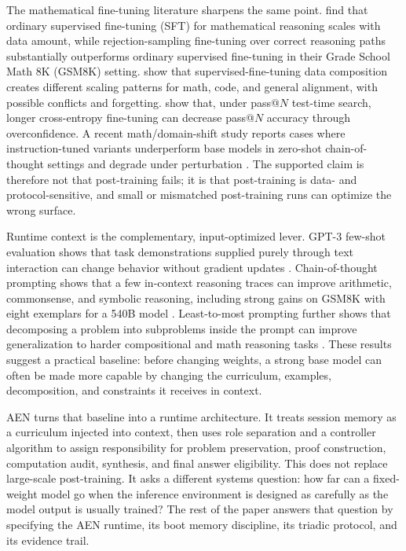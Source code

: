 \documentclass[11pt]{article}
\begin{document}
The mathematical fine-tuning literature sharpens the same point. \citet{yuan2023scalingmath} find that ordinary supervised fine-tuning (SFT) for mathematical reasoning scales with data amount, while rejection-sampling fine-tuning over correct reasoning paths substantially outperforms ordinary supervised fine-tuning in their Grade School Math 8K (GSM8K) setting. \citet{dong2024abilities} show that supervised-fine-tuning data composition creates different scaling patterns for math, code, and general alignment, with possible conflicts and forgetting. \citet{chen2025rethinking} show that, under pass@\(N\) test-time search, longer cross-entropy fine-tuning can decrease pass@\(N\) accuracy through overconfidence. A recent math/domain-shift study reports cases where instruction-tuned variants underperform base models in zero-shot chain-of-thought settings and degrade under perturbation \citep{munjal2026instructiontuned}. The supported claim is therefore not that post-training fails; it is that post-training is data- and protocol-sensitive, and small or mismatched post-training runs can optimize the wrong surface.

Runtime context is the complementary, input-optimized lever. GPT-3 few-shot evaluation shows that task demonstrations supplied purely through text interaction can change behavior without gradient updates \citep{brown2020fewshot}. Chain-of-thought prompting shows that a few in-context reasoning traces can improve arithmetic, commonsense, and symbolic reasoning, including strong gains on GSM8K with eight exemplars for a 540B model \citep{wei2022cot}. Least-to-most prompting further shows that decomposing a problem into subproblems inside the prompt can improve generalization to harder compositional and math reasoning tasks \citep{zhou2022leasttomost}. These results suggest a practical baseline: before changing weights, a strong base model can often be made more capable by changing the curriculum, examples, decomposition, and constraints it receives in context.

AEN turns that baseline into a runtime architecture. It treats session memory as a curriculum injected into context, then uses role separation and a controller algorithm to assign responsibility for problem preservation, proof construction, computation audit, synthesis, and final answer eligibility. This does not replace large-scale post-training. It asks a different systems question: how far can a fixed-weight model go when the inference environment is designed as carefully as the model output is usually trained? The rest of the paper answers that question by specifying the AEN runtime, its boot memory discipline, its triadic protocol, and its evidence trail.
\end{document}
